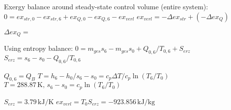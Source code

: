 Exergy balance around steady-state control volume (entire system):  
\( 0 = ex_{str,0} - ex_{str,6} + ex_{Q,0} - ex_{Q,6} - ex_{verl} \)  
\( ex_{verl} = -\Delta ex_{str} + (-\Delta ex_{Q}) \)  

\( \Delta ex_{Q} = \)  

Using entropy balance:  
\( 0 = m_{ges} s_6 - m_{ges} s_0 + Q_{0,6} / T_{0,6} + S_{erz} \)  
\( S_{erz} = s_6 - s_0 - Q_{0,6} / T_{0,6} \)  

\( Q_{0,6} = Q_B \)  
\( T = h_6 - h_0 / s_6 - s_0 = c_p \Delta T / c_p \ln(T_6 / T_0) \)  
\( T = 288.87 \, \text{K}, \, s_6 - s_0 = c_p \ln(T_6 / T_0) \)  

\( S_{erz} = 3.79 \, \text{kJ/K} \)  
\( ex_{verl} = T_0 S_{erz} = -923.856 \, \text{kJ/kg} \)